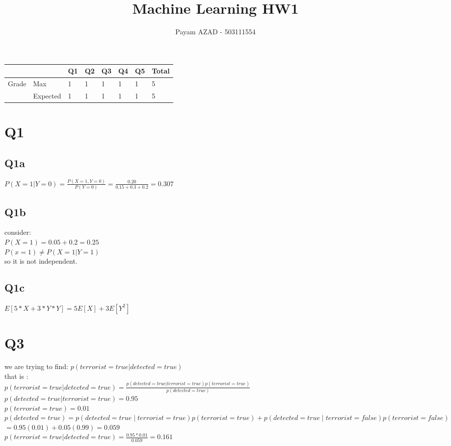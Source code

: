 \documentclass[11]{article}
\title{Machine Learning HW1}
\author{Payam AZAD - 503111554}
\begin{document}
 \maketitle
 
 \begin{table}[ht!]
\centering
\label{my-label}
\begin{tabular}{|ll|l|l|l|l|l|l|}
\hline
                                             &          & Q1 & Q2 & Q3 & Q4 & Q5 & Total \\ \hline
\multicolumn{1}{|l|}{\multirow{2}{*}{Grade}} & Max      & 1  & 1  & 1  & 1  & 1  & 5     \\ \cline{2-8} 
\multicolumn{1}{|l|}{}                       & Expected & 1  & 1  & 1  & 1  & 1  & 5     \\ \hline
\end{tabular}
\end{table}


 \section*{Q1}
 \subsection*{Q1a}
 $P(X=1|Y=0) = \frac{P(X=1,Y=0)}{P(Y=0)} = \frac{0.20}{0.15 + 0.3 + 0.2} = 0.307$
 \subsection*{Q1b}
 consider: \\
 $P(X=1) = 0.05 + 0.2 = 0.25$ \\
 $P(x=1) \neq P(X=1 | Y=1)$ \\
 so it is not independent.
 \subsection*{Q1c}
 $E[5*X + 3*Y*Y] = 5E[X] + 3E[Y^2]$
 \section*{Q3}
we are trying to find: 
$p(terrorist=true | detected=true)$ \\
that is : \\
$p(terrorist=true | detected=true) = \frac{p(detected=true | terrorist=true) p(terrorist=true ) }{p(detected=true) }$ \\
$p(detected=true | terrorist=true) = 0.95$ \\
$p(terrorist=true ) = 0.01$ \\
$p(detected=true) = p(detected=true∣terrorist=true)p(terrorist=true)+p(detected=true∣terrorist=false)p(terrorist=false)$ 
$=0.95(0.01)+0.05(0.99)=0.059$ \\
$p(terrorist=true | detected=true) = \frac{0.95 * 0.01}{0.059} = 0.161$
\end{document}
